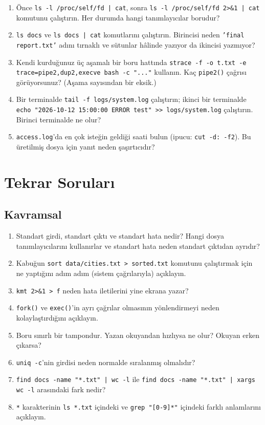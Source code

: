 \documentclass[11pt,a4paper]{article}
\newcommand{\cmd}[1]{\texttt{#1}}
\begin{document}
\begin{tryit}
\begin{enumerate}[leftmargin=1.4em]
  \item Önce \cmd{ls -l /proc/self/fd | cat}, sonra \cmd{ls -l /proc/self/fd 2>\&1 | cat} komutunu çalıştırın. Her durumda hangi tanımlayıcılar borudur?
  \item \cmd{ls docs} ve \cmd{ls docs | cat} komutlarını çalıştırın. Birincisi neden \texttt{'final report.txt'} adını tırnaklı ve sütunlar hâlinde yazıyor da ikincisi yazmıyor?
  \item Kendi kurduğunuz üç aşamalı bir boru hattında \cmd{strace -f -o t.txt -e trace=pipe2,dup2,execve bash -c "..."} kullanın. Kaç \cmd{pipe2()} çağrısı görüyorsunuz? (Aşama sayısından bir eksik.)
  \item Bir terminalde \cmd{tail -f logs/system.log} çalıştırın; ikinci bir terminalde \cmd{echo "2026-10-12 15:00:00 ERROR test" >> logs/system.log} çalıştırın. Birinci terminalde ne olur?
  \item \texttt{access.log}'da en çok isteğin geldiği saati bulun (ipucu: \cmd{cut -d: -f2}). Bu üretilmiş dosya için yanıt neden şaşırtıcıdır?
\end{enumerate}
\end{tryit}

\section{Tekrar Soruları}

\subsection*{Kavramsal}
\begin{enumerate}[leftmargin=1.6em]
  \item Standart girdi, standart çıktı ve standart hata nedir? Hangi dosya tanımlayıcılarını kullanırlar ve standart hata neden standart çıktıdan ayrıdır?
  \item Kabuğun \cmd{sort data/cities.txt > sorted.txt} komutunu çalıştırmak için ne yaptığını adım adım (sistem çağrılarıyla) açıklayın.
  \item \cmd{kmt 2>\&1 > f} neden hata iletilerini yine ekrana yazar?
  \item \cmd{fork()} ve \cmd{exec()}'in ayrı çağrılar olmasının yönlendirmeyi neden kolaylaştırdığını açıklayın.
  \item Boru sınırlı bir tampondur. Yazan okuyandan hızlıysa ne olur? Okuyan erken çıkarsa?
  \item \cmd{uniq -c}'nin girdisi neden normalde sıralanmış olmalıdır?
  \item \cmd{find docs -name "*.txt" | wc -l} ile \cmd{find docs -name "*.txt" | xargs wc -l} arasındaki fark nedir?
  \item \texttt{*} karakterinin \cmd{ls *.txt} içindeki ve \cmd{grep "[0-9]*"} içindeki farklı anlamlarını açıklayın.
\end{enumerate}
\end{document}
